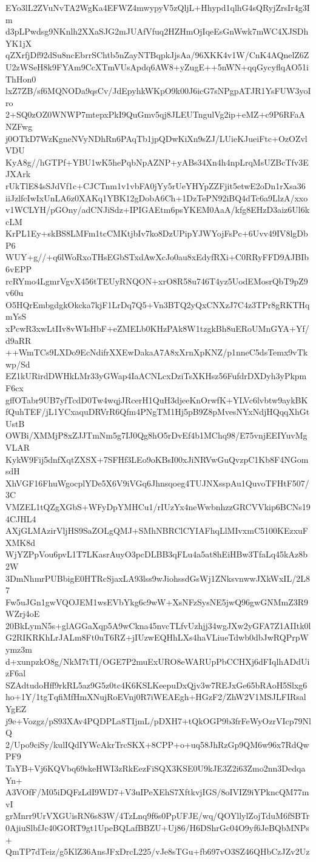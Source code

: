 EYo3lL2ZVuNvTA2WgKa4EFWZ4mwypyV5zQljL+Hhypd1qlhG4sQRyjZrsIr4g3Im
d3pLPwdsg9NKnlh2XXaSJG2mJUAfVfuq2HZHmOjIqeEsGnWwk7mWC4XJSDhYK1jX
qZXrfjDf92dSu8ncEbrrSChtb5nZayNTBqpkJjsAa/96XKK4v1W/CnK4AQnelZ6Z
U2zWSeH8k9FYAm9CcXTmVUsApdq6AW8+yZugE++5nWN+qqGycyflqAO51iThHon0
lxZ7ZB/sf6MQNODa9qsCv/JdEpyhkWKpO9k00J6icG7sNPgpATJR1YsFUW3yoIro
2+SQ0zOZ0WNWP7mtepxPkI9QuGmv5qj8JLEUTngulVg2ip+eMZ+c9P6RFaANZFwg
j0OTkD7WzKgneNVyNDhRn6PAqTb1jpQDwKiXn9sZJ/LUieKJueiFtc+OzOZvlVDU
KyA8g//hGTPf+YBU1wK5hePqbNpAZNP+yABs34Xn4h4npLrqMsUZBcTfv3EJXArk
rUkTlE84sSJdVf1c+CJCTnm1v1vbFA0jYy5rUeYHYpZZFjit5etwE2oDn1rXsa36
iiJzlfcIwIxUnLA6z0XAKq1YBK12gDobA6Ch+1DzTePN92iBQ4dTc6a9LlzA/xxo
v1WCLYH/pGOny/adCNJiSdz+IPIGAEtm6psYKEM0AaA/kfg8EHzD3aiz6Ul6kcLM
KrPL1Ey+skBS8LMFm1tcCMKtjbIv7ko8DzUPipYJWYojFsPc+6Uvv49IV8lgDbP6
WUY+g//+q6lWoRxoTHsEGbSTxdAwXcJo0au8xEdyfRXi+C0RRyFFD9AJBIb6vEPP
rcRYmo4LgmrVgvX456tTEUyRNQON+xrO8R58u746T4yz5UodEMosrQbT9pZ9v60u
O5HQrEmbgdgkOkcka7kjF1LrDq7Q5+Vn3BTQ2yQxCNXzJ7C4z3TPr8gRKTHqmYsS
xPcwR3xwLtIIv8vWIsHbF+eZMELb0KHzPAk8W1tzgkBh8uERoUMnGYA+Yf/d9aRR
++WmTCs9LXDo9EcNdifrXXEwDakaA7A8xXrnXpKNZ/p1nneC5dsTemx9vTkwp/Sd
EZ1kURirdDWHkLMr33yGWap4IaACNLcxDziTsXKHsz56FufdrDXDyh3yPkpmF6cx
gffOTabr9UB7yfTcdD0Tw4wqjJRcerH1QuH3djeeKnOrwfK+YLVc6lvbtw9aykBK
fQuhTEF/jL1YCxaquDRVrR6Qfm4PNgTM1Hj5pB9Z8pMvesNYxNdjHQqqXhGtUstB
OWBi/XMMjP8xZJJTmNm5g7IJ0Qg8hO5rDvEf4b1MChq98/E75vnjEEIYuvMgVLAR
KykW9Fij5dnfXqtZXSX+7SFHf3LEo9oKBsI00xJiNRVwGuQvzpC1Kb8F4NGomsdH
XhVGF16FhuWgocplYDe5X6V9iVGq6Jhnsqoeg4TUJNXsspAu1QuvoTFHtF507/3C
VMZEL1tQZgXGbS+WFyDpYMHCu1/rIUzYx4neWwbnhzzGRCVVkip6BCNs194CJHL4
AXjGLMAzirVljHS9SaZOLgQMJ+SMhNBRClCYIAFhqLlMIvxmC5100KEzxuFXMK8d
WjYZPpVou6pvL1T7LKasrAuyO3pcDLBB3qFLu4a5at8hEiHBw3TfaLq45kAz8b2W
3DmNhmrPUBbigE0HTRcSjaxLA93lss9wJiohssdGsWj1ZNksvnwwJXkWxIL/2L87
Fw5uJGn1gwVQOJEM1wsEVbYkg6c9wW+XsNFzSysNE5jwQ96gwGNMmZ3R9WZrj4oE
20BkLymN5s+glAGGaXqp5A9wCkna45nvcTLfvUzhjj34wgJXw2yGFA7Z1AIItk0l
G2RIKRKhLrJALm8Ft0uT6RZ+jIUzwEQHhLXs4haVLiueTdwb0dbJwRQPrpWymz3m
d+xunpzkO8g/NkM7tTI/OGE7P2muExURO8eWARUpPbCCHXj6dFIqlhADdUizF6al
SZAdtudoHff9rkRL5az9G5z0tc4K6KSLKeepuDxQjv3w7REJxGe65bRAoH5Slxg6
ho+1Y/1tgTqfiMfHmXNujRoEVnj0R7iWEAEgh+HGzF2/ZhW2V1MSJLFIRsalYgEZ
j9e+Vozgz/pS93XAv4PQDPLa8TIjmL/pDXH7+tQkOGP9b3frFeWyOzrVIcp79NlQ
2/Upo9ciSy/kulIQdIYWcAkrTrcSKX+8CPP+o+uq58JhRzGp9QM6w96x7RdQwPF9
TaYB+Vj6KQVbq69skeHWI3zRkEezFiSQX3KSE0U9kJE3Z2i63Zmo2nn3DedqaYn+
A3VOfF/M05iDQFzLdI9WD7+V3uIPeXEhS7XftkvjIGS/8oIVIZ9iYPkncQM77mvI
grMnrr9UrVXGUisRN6s83W/4TzLnq9f6s0PpUFJE/wq/QOYllylZojTduM6fSBTr
0AjiuSlbfJc40GORT9gt1UpeBQLafBBZU+Uj86/H6DShrGc04O9yf6JeBQbMNPs+
QmTP7dTeiz/g5KlZ36AnsJFxDrcL225/vJe8sTGu+fb697vO3SZ46QHbCzJZv2Uz
